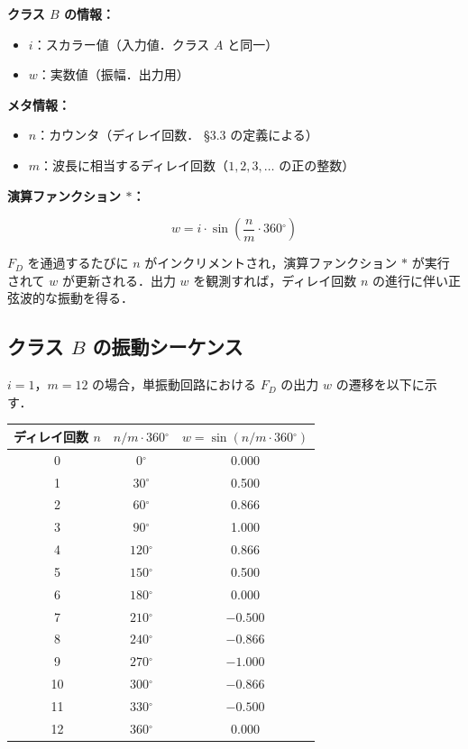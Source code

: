 \documentclass[12pt,a4paper]{ltjsarticle}
\begin{document}
\textbf{クラス $B$ の情報：}

\begin{itemize}
  \item $i$：スカラー値（入力値．クラス $A$ と同一）
  \item $w$：実数値（振幅．出力用）
\end{itemize}

\textbf{メタ情報：}

\begin{itemize}
  \item $n$：カウンタ（ディレイ回数．\cite{ref2} \S 3.3 の定義による）
  \item $m$：波長に相当するディレイ回数（$1, 2, 3, \ldots$ の正の整数）
\end{itemize}

\textbf{演算ファンクション $*$：}

\begin{equation}
w = i \cdot \sin\!\left(\frac{n}{m} \cdot 360{}^\circ\right)
\end{equation}

$F_D$ を通過するたびに $n$ がインクリメントされ，演算ファンクション $*$ が実行されて $w$ が更新される．出力 $w$ を観測すれば，ディレイ回数 $n$ の進行に伴い正弦波的な振動を得る．

\subsection{クラス $B$ の振動シーケンス}

$i = 1$，$m = 12$ の場合，単振動回路における $F_D$ の出力 $w$ の遷移を以下に示す．

\begin{table}[htbp]
  \centering
  \begin{tabular}{ccc}
    \toprule
    ディレイ回数 $n$ & $n/m \cdot 360{}^\circ$ & $w = \sin(n/m \cdot 360{}^\circ)$ \\
    \midrule
    0  & $0{}^\circ$   & 0.000 \\
    1  & $30{}^\circ$  & 0.500 \\
    2  & $60{}^\circ$  & 0.866 \\
    3  & $90{}^\circ$  & 1.000 \\
    4  & $120{}^\circ$ & 0.866 \\
    5  & $150{}^\circ$ & 0.500 \\
    6  & $180{}^\circ$ & 0.000 \\
    7  & $210{}^\circ$ & $-0.500$ \\
    8  & $240{}^\circ$ & $-0.866$ \\
    9  & $270{}^\circ$ & $-1.000$ \\
    10 & $300{}^\circ$ & $-0.866$ \\
    11 & $330{}^\circ$ & $-0.500$ \\
    12 & $360{}^\circ$ & 0.000 \\
    \bottomrule
  \end{tabular}
\end{table}
\end{document}
